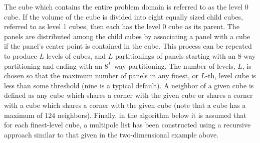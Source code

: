 The cube which contains the entire problem domain is referred to as
the level 0 cube. If the volume of the cube is divided into eight
equally sized child cubes, referred to as level 1 cubes, then each has
the level 0 cube as its parent. The panels are distributed among the
child cubes by associating a panel with a cube if the panel's center
point is contained in the cube. This process can be repeated to
produce $ L $ levels of cubes, and $ L $ partitionings of panels starting
with an $8$-way partitioning and ending with an $ 8^L $-way partitioning.
The number of levels, $ L $, is chosen so that the maximum number of
panels in any finest, or $L$-th, level cube is less than some
threshold (nine is a typical default).  A neighbor of a given cube is
defined as any cube which shares a corner with the given cube or
shares a corner with a cube which shares a corner with the given cube
(note that a cube has a maximum of $ 124 $ neighbors).  Finally, in
the algorithm below it is assumed that for each finest-level cube, a
multipole list has been constructed using a recursive approach similar
to that given in the two-dimensional example above.


